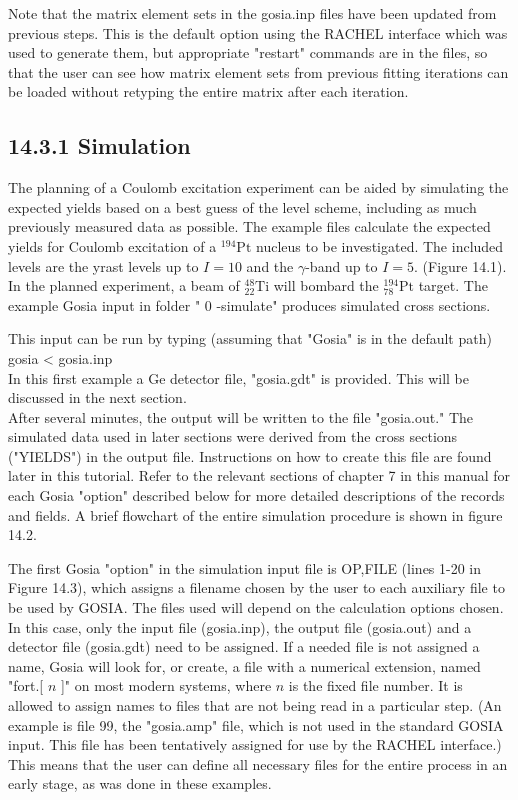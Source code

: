 \documentclass[10pt]{article}
\begin{document}
Note that the matrix element sets in the gosia.inp files have been updated from previous steps. This is the default option using the RACHEL interface which was used to generate them, but appropriate "restart" commands are in the files, so that the user can see how matrix element sets from previous fitting iterations can be loaded without retyping the entire matrix after each iteration.

\subsection*{14.3.1 Simulation}
The planning of a Coulomb excitation experiment can be aided by simulating the expected yields based on a best guess of the level scheme, including as much previously measured data as possible. The example files calculate the expected yields for Coulomb excitation of a ${ }^{194} \mathrm{Pt}$ nucleus to be investigated. The included levels are the yrast levels up to $I=10$ and the $\gamma$-band up to $I=5$. (Figure 14.1). In the planned experiment, a beam of ${ }_{22}^{48} \mathrm{Ti}$ will bombard the ${ }_{78}^{194} \mathrm{Pt}$ target. The example Gosia input in folder " 0 -simulate" produces simulated cross sections.

This input can be run by typing (assuming that "Gosia" is in the default path)\\
gosia < gosia.inp\\
In this first example a Ge detector file, "gosia.gdt" is provided. This will be discussed in the next section.\\
After several minutes, the output will be written to the file "gosia.out." The simulated data used in later sections were derived from the cross sections ("YIELDS") in the output file. Instructions on how to create this file are found later in this tutorial. Refer to the relevant sections of chapter 7 in this manual for each Gosia "option" described below for more detailed descriptions of the records and fields. A brief flowchart of the entire simulation procedure is shown in figure 14.2.

The first Gosia "option" in the simulation input file is OP,FILE (lines 1-20 in Figure 14.3), which assigns a filename chosen by the user to each auxiliary file to be used by GOSIA. The files used will depend on the calculation options chosen. In this case, only the input file (gosia.inp), the output file (gosia.out) and a detector file (gosia.gdt) need to be assigned. If a needed file is not assigned a name, Gosia will look for, or create, a file with a numerical extension, named "fort.[ $n$ ]" on most modern systems, where $n$ is the fixed file number. It is allowed to assign names to files that are not being read in a particular step. (An example is file 99, the "gosia.amp" file, which is not used in the standard GOSIA input. This file has been tentatively assigned for use by the RACHEL interface.) This means that the user can define all necessary files for the entire process in an early stage, as was done in these examples.
\end{document}
